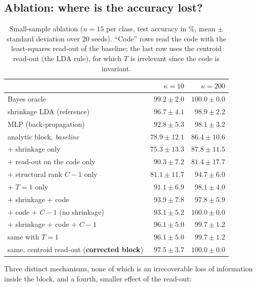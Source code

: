 \documentclass[11pt,a4paper]{article}
\theoremstyle{plain}
\theoremstyle{definition}
\theoremstyle{remark}
\begin{document}
\subsection{Ablation: where is the accuracy lost?}
\begin{table}[h]
\centering\small\renewcommand{\arraystretch}{1.12}
\caption{Small-sample ablation ($n=15$ per class, test accuracy in \%, mean $\pm$ standard deviation over 20 seeds). ``Code'' rows read the code with the least-squares read-out of the baseline; the last row uses the centroid read-out (the LDA rule), for which $T$ is irrelevant since the code is invariant.}
\label{tab:ablation}
\begin{tabular}{@{}lrr@{}}
\toprule
 & $\kappa=10$ & $\kappa=200$ \\
\midrule
Bayes oracle & $99.2\pm2.0$ & $100.0\pm0.0$ \\
shrinkage LDA (reference) & $96.7\pm4.1$ & $98.9\pm2.2$ \\
MLP (back-propagation) & $92.8\pm5.3$ & $98.1\pm3.2$ \\
\midrule
analytic block, \emph{baseline} & $78.9\pm12.1$ & $86.4\pm10.6$ \\
\quad $+$ shrinkage only & $75.3\pm13.3$ & $87.8\pm11.5$ \\
\quad $+$ read-out on the code only & $90.3\pm7.2$ & $81.4\pm17.7$ \\
\quad $+$ structural rank $C-1$ only & $81.1\pm11.7$ & $94.7\pm6.0$ \\
\quad $+$ $T=1$ only & $91.1\pm6.9$ & $98.1\pm4.0$ \\
\quad $+$ shrinkage $+$ code & $93.9\pm7.8$ & $97.8\pm5.9$ \\
\quad $+$ code $+$ $C-1$ (no shrinkage) & $93.1\pm5.2$ & $100.0\pm0.0$ \\
\quad $+$ shrinkage $+$ code $+$ $C-1$ & $96.1\pm5.0$ & $99.7\pm1.2$ \\
\quad same with $T=1$ & $96.1\pm5.0$ & $99.7\pm1.2$ \\
\quad same, centroid read-out (\textbf{corrected block}) & $\mathbf{97.5\pm3.7}$ & $\mathbf{100.0\pm0.0}$ \\
\bottomrule
\end{tabular}
\end{table}
Three distinct mechanisms, none of which is an irrecoverable loss of
information inside the block, and a fourth, smaller effect of the read-out:
\end{document}

